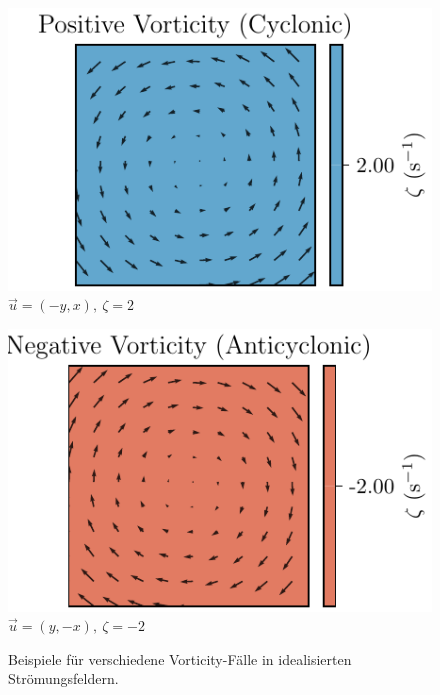 \begin{figure}
    \begin{minipage}{0.32\linewidth}
        \centering
        \includegraphics[width=\linewidth]{papers/rossby/images/vorticity_plot3.pdf}\\
        {\small \( \vec{u} = (-y,x),\ \zeta = 2\)}
    \end{minipage}
    \begin{minipage}{0.32\linewidth}
        \centering
        \includegraphics[width=\linewidth]{papers/rossby/images/vorticity_plot4.pdf}\\
        {\small \( \vec{u} = (y,-x),\ \zeta = -2\)}
    \end{minipage}

    \caption{Beispiele für verschiedene Vorticity-Fälle in idealisierten Strömungsfeldern.}
    \label{fig:vorticity_examples}
\end{figure}


